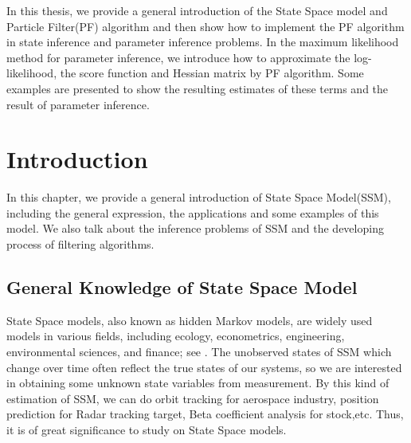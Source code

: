 \documentclass[mstat,12pt]{unswthesis}  %
\newcommand\blankpage{%
    \null
    \thispagestyle{empty}%
    \addtocounter{page}{-1}%
    \newpage}
\numberwithin{equation}{section}
\begin{document}


In this thesis, we provide a general introduction of the State Space model and Particle Filter(PF) algorithm and then show how to implement the PF algorithm in state inference and parameter inference problems. In the maximum likelihood method for parameter inference, we introduce how to approximate the log-likelihood, the score function and Hessian matrix by PF algorithm. Some examples are presented  to show the resulting estimates of these terms and the result of parameter inference. 
\afterpage{\blankpage}


\afterpreface





%
%




\afterpage{\blankpage}

\chapter{Introduction}\label{s-intro}
In this chapter, we provide a general introduction
of State Space Model(SSM), including the general expression,
the applications and some examples of this model.
We also talk about the inference problems of SSM and 
the developing process of filtering algorithms.\\

\section{General Knowledge of State Space Model}\label{SSM}

State Space models, also known as hidden Markov models, are widely used models in various fields, including ecology, econometrics, engineering, environmental sciences, and finance; see \cite{cappe2006inference,arnaud2001sequential,
elliott2008hidden,west2006bayesian,durbin2012time}. The unobserved states of SSM which change over time  often reflect the true states of our systems, so we are interested in obtaining some unknown state variables from measurement. By this kind of estimation of SSM, we can do orbit tracking for aerospace industry, position prediction for Radar tracking target, Beta coefficient analysis for stock,etc. 
Thus, it is of great significance to study on State Space models. \\
\end{document}
